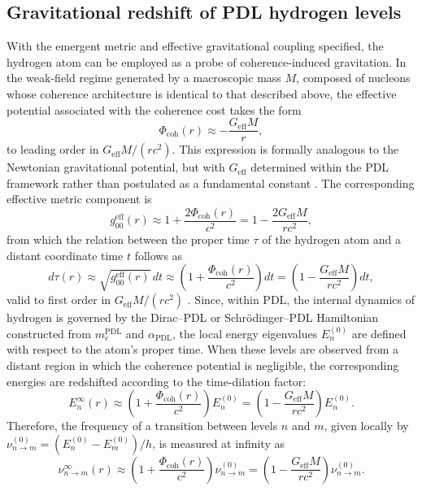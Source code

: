 \documentclass[11pt,a4paper]{article}
\theoremstyle{definition}
\newcommand{\PDL}{\mathrm{PDL}}
\newcommand{\Geff}{G_{\mathrm{eff}}}
\newcommand{\alphaPDL}{\alpha_{\mathrm{PDL}}}
\begin{document}
\subsection{Gravitational redshift of PDL hydrogen levels}

With the emergent metric and effective gravitational coupling specified, the hydrogen atom can be employed as a probe of coherence-induced gravitation. In the weak-field regime generated by a macroscopic mass $M$, composed of nucleons whose coherence architecture is identical to that described above, the effective potential associated with the coherence cost takes the form
\[
\Phi_{\mathrm{coh}}(r) \approx -\frac{\Geff M}{r},
\]
to leading order in $\Geff M/(r c^2)$. This expression is formally analogous to the Newtonian gravitational potential, but with $\Geff$ determined within the PDL framework rather than postulated as a fundamental constant \cite{PDL_Global_Mapping_Structures_Results_Open_Problems,A_Topological_Reformulation_in_the_Projective_Dynamic_Logo_Framework_Hierarchical_Coherence_Filtering_and_the_Exponent_18_in_PDL}. The corresponding effective metric component is
\[
g_{00}^{\mathrm{eff}}(r) \approx 1 + \frac{2\Phi_{\mathrm{coh}}(r)}{c^2} = 1 - \frac{2\Geff M}{r c^2},
\]
from which the relation between the proper time $\tau$ of the hydrogen atom and a distant coordinate time $t$ follows as
\[
d\tau(r) \approx \sqrt{g_{00}^{\mathrm{eff}}(r)}\,dt \approx \left(1 + \frac{\Phi_{\mathrm{coh}}(r)}{c^2}\right)dt = \left(1 - \frac{\Geff M}{r c^2}\right)dt,
\]
valid to first order in $\Geff M/(r c^2)$ \cite{A_Topological_Reformulation_in_the_Projective_Dynamic_Logo_Framework_Hierarchical_Coherence_Filtering_and_the_Exponent_18_in_PDL,PDL_Global_Mapping_Structures_Results_Open_Problems}. Since, within PDL, the internal dynamics of hydrogen is governed by the Dirac–PDL or Schr\"odinger–PDL Hamiltonian constructed from $m_e^{\PDL}$ and $\alphaPDL$, the local energy eigenvalues $E_n^{(0)}$ are defined with respect to the atom’s proper time. When these levels are observed from a distant region in which the coherence potential is negligible, the corresponding energies are redshifted according to the time-dilation factor:
\[
E_n^{\infty}(r) \approx \left(1 + \frac{\Phi_{\mathrm{coh}}(r)}{c^2}\right) E_n^{(0)} = \left(1 - \frac{\Geff M}{r c^2}\right) E_n^{(0)}.
\]
Therefore, the frequency of a transition between levels $n$ and $m$, given locally by $\nu_{n\to m}^{(0)} = \left(E_n^{(0)}-E_m^{(0)}\right)/h$, is measured at infinity as
\[
\nu_{n\to m}^{\infty}(r) \approx \left(1 + \frac{\Phi_{\mathrm{coh}}(r)}{c^2}\right)\nu_{n\to m}^{(0)} = \left(1 - \frac{\Geff M}{r c^2}\right)\nu_{n\to m}^{(0)}.
\]
\end{document}
